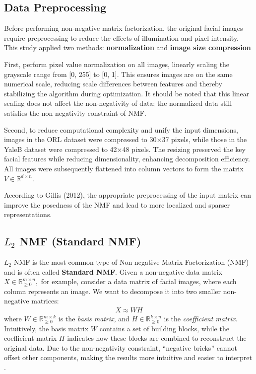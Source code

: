 \subsection{Data Preprocessing}
Before performing non-negative matrix factorization, the original facial images require preprocessing to reduce the effects of illumination and pixel intensity. This study applied two methods: \textbf{normalization} and \textbf{image size compression}

First, perform pixel value normalization on all images, linearly scaling the grayscale range from [0, 255] to [0, 1]. This ensures images are on the same numerical scale, reducing scale differences between features and thereby stabilizing the algorithm during optimization. It should be noted that this linear scaling does not affect the non-negativity of data; the normalized data still satisfies the non-negativity constraint of NMF.

Second, to reduce computational complexity and unify the input dimensions, images in the ORL dataset were compressed to 30×37 pixels, while those in the YaleB dataset were compressed to 42×48 pixels. The resizing preserved the key facial features while reducing dimensionality, enhancing decomposition efficiency. All images were subsequently flattened into column vectors to form the matrix $V \in \mathbb{R}^{d \times n}$.

According to Gillis (2012), the appropriate preprocessing of the input matrix can improve the posedness of the NMF and lead to more localized and sparser representations\cite{gillis2012sparse}.


\subsection{$L_2$ NMF (Standard NMF)}
$L_2$-NMF is the most common type of Non-negative Matrix Factorization (NMF) and is often called \textbf{Standard NMF}. Given a non-negative data matrix $X \in \mathbb{R}^{m \times n}_{\geq 0},$ for example, consider a data matrix of facial images, where each column represents an image. We want to decompose it into two smaller non-negative matrices:
\begin{align}
    X \approx WH
\end{align}
where \(W \in \mathbb{R}^{m \times k}_{\geq 0}\) is the \textit{basis matrix}, and \(H \in \mathbb{R}^{k \times n}_{\geq 0}\) is the \textit{coefficient matrix}. Intuitively, the basis matrix $W$ contains a set of building blocks, while the coefficient matrix $H$ indicates how these blocks are combined to reconstruct the original data. Due to the non-negativity constraint, “negative bricks” cannot offset other components, making the results more intuitive and easier to interpret \cite{lee1999learning}.  

